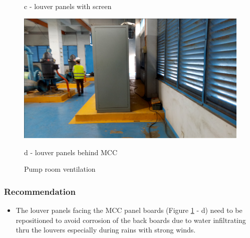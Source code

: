 \begin{figure}
\begin{minipage}[b]{0.22\linewidth}
		\caption*{c - louver panels with screen}
		\label{ch047_wem_louverpanel_upclose}
	\end{minipage}
	\hspace{0.05cm}
	\begin{minipage}[b]{0.22\linewidth}
		\centering
		\includegraphics[width=\textwidth]{figures/fig_ch047_wem_louverpanel_mcc}
		\caption*{d - louver panels behind MCC}
		\label{ch047_wem_louverpanel_mcc}
	\end{minipage}
\caption{Pump room ventilation}
\label{pump_room_ventilation}
\end{figure}





\subsubsection{Recommendation}

\begin{itemize}
\item The louver panels facing the MCC panel boards (Figure \ref{pump_room_ventilation} - d) need to be repositioned to avoid corrosion of the back boards due to water infiltrating thru the louvers especially during rains with strong winds.



\end{itemize}





